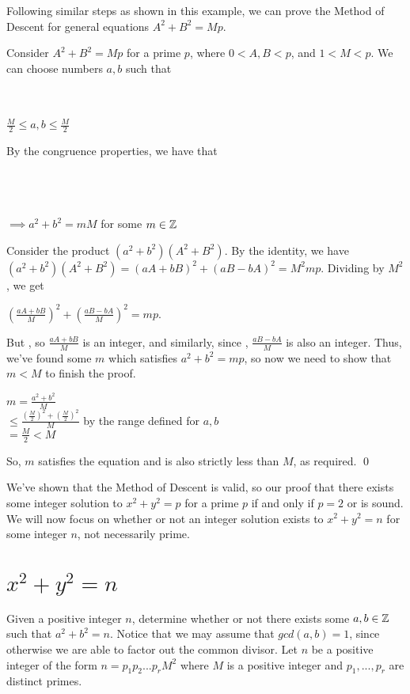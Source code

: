 \documentclass[../main.tex]{subfiles}
\begin{document}
Following similar steps as shown in this example, we can prove the Method of Descent for general equations $A^2+B^2=Mp$.
\begin{pf}
    Consider $A^2+B^2=Mp$ for a prime $p$, where $0 < A,B < p$, and $1 < M < p$. We can choose numbers $a,b$ such that 
    \begin{center}
         \\
         \\
        $\tfrac{M}{2} \leq a,b \leq \tfrac{M}{2}$
    \end{center}
    By the congruence properties, we have that
    \begin{center}
         \\
         \\
         \\
        $\implies a^2+b^2=mM$ for some $m \in \mathbb{Z}$
    \end{center}
    Consider the product $(a^2+b^2)(A^2+B^2)$. By the identity, we have $(a^2+b^2)(A^2+B^2)=(aA+bB)^2+(aB-bA)^2=M^2mp$. Dividing by $M^2$, we get
    \begin{center}
        $(\tfrac{aA+bB}{M})^2+(\tfrac{aB-bA}{M})^2=mp$.
    \end{center}
    But , so $\tfrac{aA+bB}{M}$ is an integer, and similarly, since , $\tfrac{aB-bA}{M}$ is also an integer. Thus, we've found some $m$ which satisfies $a^2+b^2=mp$, so now we need to show that $m < M$ to finish the proof.
    \begin{center}
        $m = \tfrac{a^2+b^2}{M}$ \\
        $\leq \tfrac{(\tfrac{M}{2})^2+(\tfrac{M}{2})^2}{M}$ by the range defined for $a,b$ \\
        $=\tfrac{M}{2} < M$
    \end{center}
    So, $m$ satisfies the equation and is also strictly less than $M$, as required. \qed
\end{pf}

We've shown that the Method of Descent is valid, so our proof that there exists some integer solution to $x^2+y^2=p$ for a prime $p$ if and only if $p=2$ or  is sound. We will now focus on whether or not an integer solution exists to $x^2+y^2=n$ for some integer $n$, not necessarily prime.

\section{$x^2+y^2=n$}
Given a positive integer $n$, determine whether or not there exists some $a,b \in \mathbb{Z}$ such that $a^2+b^2=n$. Notice that we may assume that $gcd(a,b)=1$, since otherwise we are able to factor out the common divisor. \sspace
Let $n$ be a positive integer of the form $n=p_1p_2...p_rM^2$ where $M$ is a positive integer and $p_1,...,p_r$ are distinct primes.
\end{document}
